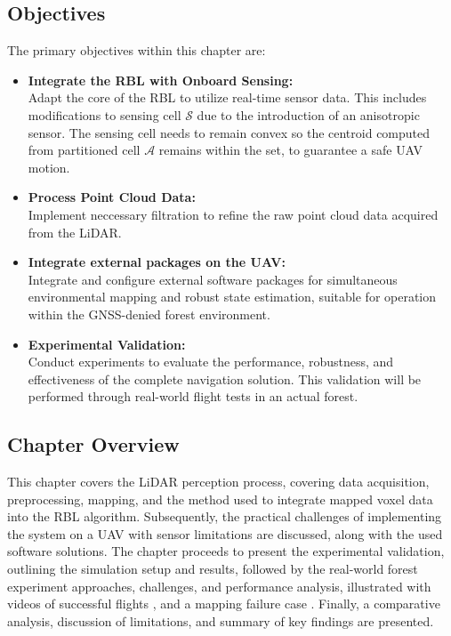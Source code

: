         \subsection{Objectives}
            The primary objectives within this chapter are: 
            \begin{itemize}
                \item \textbf{Integrate the \ac{RBL} with Onboard Sensing: } \\
                    Adapt the core of the \ac{RBL} to utilize real-time sensor data. 
                    This includes modifications to sensing cell $\mathcal{S}$ due to the introduction of an anisotropic sensor. 
                    The sensing cell needs to remain convex so the centroid computed from partitioned cell $\mathcal{A}$ remains within the set, to guarantee a safe \ac{UAV} motion.
                \item \textbf{Process Point Cloud Data: } \\
                    Implement neccessary filtration to refine the raw point cloud data acquired from the \ac{LiDAR}.
                \item \textbf{Integrate external packages on the \ac{UAV}: } \\
                    Integrate and configure external software packages for simultaneous environmental mapping and robust state estimation, suitable for operation within the \ac{GNSS}-denied forest environment.
                \item \textbf{Experimental Validation: } \\
                    Conduct experiments to evaluate the performance, robustness, and effectiveness of the complete navigation solution. 
                    This validation will be performed through real-world flight tests in an actual forest.
            \end{itemize}

        \subsection{Chapter Overview}
            This chapter covers the \ac{LiDAR} perception process, covering data acquisition, preprocessing, mapping, and the method used to integrate mapped voxel data into the \ac{RBL} algorithm. 
            Subsequently, the practical challenges of implementing the system on a \ac{UAV} with sensor limitations are discussed, along with the used software solutions. 
            The chapter proceeds to present the experimental validation, outlining the simulation setup and results, followed by the real-world forest experiment approaches, challenges, and performance analysis, illustrated with videos of successful flights \cite{aggressive_flight}, \cite{conservative_flight} and a mapping failure case \cite{flight_fail}. 
            Finally, a comparative analysis, discussion of limitations, and summary of key findings are presented.
    
